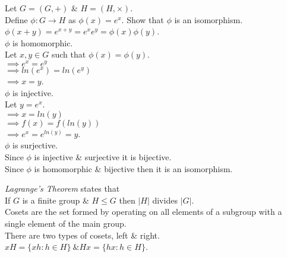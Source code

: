 \documentclass[11pt,a4paper]{article}
\begin{document}
Let $G=(G,+)$ \& $H=(H,\times)$.\\
Define $\phi : G\to H$ as $\phi(x)=e^x$. Show that $\phi$ is an isomorphism.\\

\-\hspace{2em}$\phi(x+y)=e^{x+y}=e^xe^y=\phi(x)\phi(y)$.\\
\-\hspace{2em}$\phi$ is homomorphic.\\

\-\hspace{2em}Let $x, y \in G$ such that $\phi(x)=\phi(y)$.\\
\-\hspace{2em}$\implies e^x=e^y$\\
\-\hspace{2em}$\implies ln(e^x)=ln(e^y)$\\
\-\hspace{2em}$\implies x=y$.\\
\-\hspace{2em}$\phi$ is injective.\\

\-\hspace{2em}Let $y=e^x$.\\
\-\hspace{2em}$\implies x=ln(y)$\\
\-\hspace{2em}$\implies f(x) = f(ln(y))$\\
\-\hspace{2em}$\implies e^x = e^{ln(y)}=y$.\\
\-\hspace{2em}$\phi$ is surjective.\\

\-\hspace{2em}Since $\phi$ is injective \& surjective it is bijective.\\
\-\hspace{2em}Since $\phi$ is homomorphic \& bijective then it is an isomorphism.\\

\newpage{}

\textit{Lagrange's Theorem} states that\\
\-\hspace{1em}If $G$ is a finite group \& $H \leq G$ then $|H|$ divides $|G|$.\\
Cosets are the set formed by operating on all elements of a subgroup with a single element of the main group.\\
There are two types of cosets, left \& right.\\
\-\hspace{2em}$xH=\{xh:h\in H\}\ \& Hx=\{hx:h\in H\}$.\\
\end{document}
